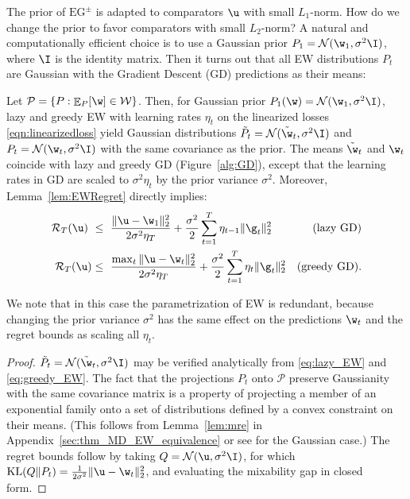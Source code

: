\documentclass{colt2018} %
\DeclareMathOperator*{\E}{\mathbb{E}}
\DeclareMathOperator{\kl}{KL}
\newcommand{\domainP}{\mathcal{P}}
\newcommand{\domainw}{\mathcal{W}}
\newcommand{\normal}{\mathcal{N}}       %
\newcommand{\regret}{\mathcal{R}}
\begin{document}
% 
% 
% 
% 
% 
% 
% 
% 
% 
% 
% 
% 
% 
% 
% 
% 
% 
% 
% 
% 
% 
% 
% 
% 
% 
% 
% 
% 
% 
% 
% 
% 
% 
% 
% 
% 
% 
% 
% 
% 
% 
% 
% 
% 
% 
% 
% 
% 
% 
% 
% 
% 
% 
% 
% 
% 
% 
% 
% 
% 
% 
% 
% 
% 
% 
% 
% 
% 
% 
% 
% 
% 
% 

The prior of $\text{EG}^\pm$ is adapted to comparators $\u$ with small
$L_1$-norm.
% 
% 
How do we change the prior to favor comparators with small $L_2$-norm? A
natural and computationally efficient choice is to use a Gaussian prior
$P_1 = \normal(\w_1,\sigma^2 \I)$, where $\I$ is the identity matrix.
Then it turns out that all EW distributions $P_t$ are Gaussian with the
Gradient Descent (GD) predictions as their means:
% 
\begin{theorem}\label{thm:GDasEW}
Let $\domainP = \{P :
\E_P[\w] \in \domainw\}$. Then, for Gaussian prior $P_1(\w) =
\normal(\w_1, \sigma^2 \I)$, lazy and
greedy EW with learning rates $\eta_t$ on the linearized
losses \eqref{eqn:linearizedloss} yield Gaussian
distributions $\tilde{P}_t = \normal(\tilde{\w}_t,\sigma^2 \I)$ and $P_t = \normal(\w_t, \sigma^2 \I)$  
% 
% 
% 
% 
% 
% 
% 
with the same covariance as the prior. The means $\tilde{\w}_t$ and
$\w_t$ coincide with lazy and greedy GD (Figure~\ref{alg:GD}), except
that the learning rates in GD are scaled to $\sigma^2 \eta_t$ by the
prior variance $\sigma^2$.
Moreover, Lemma~\ref{lem:EWRegret} directly implies:
% 
\begin{align*}
  \regret_T(\u) ~&\leq ~\frac{\|\u - \w_1\|_2^2}{2\sigma^2\eta_T} + 
      \frac{\sigma^2}{2}\sum_{t=1}^T \eta_{t-1} \|\g_t\|_2^2 & \text{(lazy GD)}\\
  \regret_T(\u) &\leq ~ \frac{\max_t \|\u - \w_t\|_2^2}{2\sigma^2\eta_T} + 
      \frac{\sigma^2}{2}\sum_{t=1}^T \eta_t \|\g_t\|_2^2 & \text{(greedy GD).}
\end{align*}
\end{theorem} 
% 
We note that in this case the parametrization of EW is redundant,
because changing the prior variance $\sigma^2$ has the same effect on
the predictions $\w_t$ and the regret bounds as
scaling all $\eta_t$.
% 
\begin{proof}
$\tilde{P}_t = \normal(\tilde{\w}_t,\sigma^2 \I)$ may be verified analytically from
\eqref{eq:lazy_EW} and \eqref{eq:greedy_EW}. The fact that the
projections $P_t$ onto $\domainP$ preserve Gaussianity with the same
covariance matrix is a property of projecting a member of an exponential
family onto a set of distributions defined by a convex constraint
on their means.
(This follows from Lemma~\ref{lem:mre} in
Appendix~\ref{sec:thm_MD_EW_equivalence} or see
\citep[Lemma~9]{VanErvenKoolen2016} for the Gaussian case.)
The regret bounds follow by taking $Q = \normal(\u,\sigma^2 \I)$, for
which $\kl(Q \| P_t) = \frac{1}{2\sigma^2}\|\u - \w_t\|_2^2$, and
evaluating the mixability gap in closed form.
\end{proof}
\end{document}
